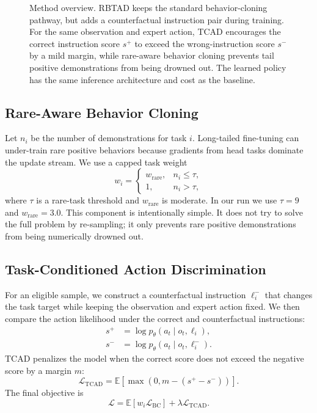 \begin{figure}[t]
  \caption{Method overview. RBTAD keeps the standard behavior-cloning pathway, but adds a counterfactual instruction pair during training. For the same observation and expert action, TCAD encourages the correct instruction score $s^+$ to exceed the wrong-instruction score $s^-$ by a mild margin, while rare-aware behavior cloning prevents tail positive demonstrations from being drowned out. The learned policy has the same inference architecture and cost as the baseline.}
  \label{fig:method}
\end{figure}

\subsection{Rare-Aware Behavior Cloning}

Let $n_i$ be the number of demonstrations for task $i$. Long-tailed fine-tuning can under-train rare positive behaviors because gradients from head tasks dominate the update stream. We use a capped task weight
\begin{equation}
  w_i =
  \begin{cases}
    w_{\mathrm{rare}}, & n_i \le \tau,\\
    1, & n_i > \tau,
  \end{cases}
\end{equation}
where $\tau$ is a rare-task threshold and $w_{\mathrm{rare}}$ is moderate. In our \liberocorelt{} run we use $\tau=9$ and $w_{\mathrm{rare}}=3.0$. This component is intentionally simple. It does not try to solve the full problem by re-sampling; it only prevents rare positive demonstrations from being numerically drowned out.

\subsection{Task-Conditioned Action Discrimination}

For an eligible sample, we construct a counterfactual instruction $\ell_i^{-}$ that changes the task target while keeping the observation and expert action fixed. We then compare the action likelihood under the correct and counterfactual instructions:
\begin{align}
  s^+ &= \log p_\theta(a_t \mid o_t,\ell_i),\\
  s^- &= \log p_\theta(a_t \mid o_t,\ell_i^{-}).
\end{align}
TCAD penalizes the model when the correct score does not exceed the negative score by a margin $m$:
\begin{equation}
  \mathcal{L}_{\mathrm{TCAD}}
  =
  \mathbb{E}
  \left[
  \max(0, m - (s^+ - s^-))
  \right].
\end{equation}
The final objective is
\begin{equation}
  \mathcal{L}
  =
  \mathbb{E}\left[w_i \mathcal{L}_{\mathrm{BC}}\right]
  +
  \lambda \mathcal{L}_{\mathrm{TCAD}}.
\end{equation}

